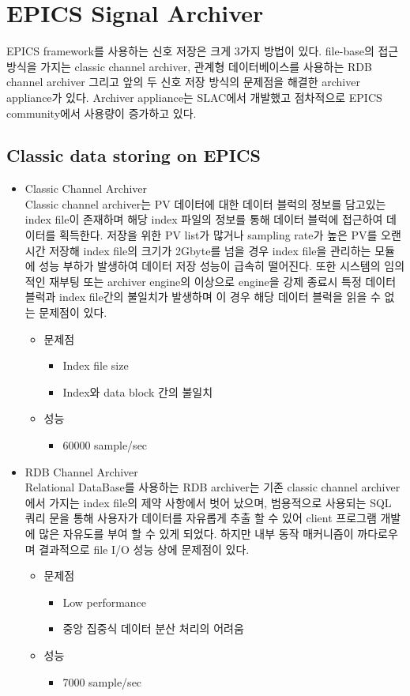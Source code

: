 \documentclass[11pt
  , a4paper
  , article
  , oneside
]{memoir}
\begin{document}
\section{EPICS Signal Archiver}
EPICS framework를 사용하는 신호 저장은 크게 3가지 방법이 있다. file-base의 접근 방식을 가지는 classic channel archiver, 관계형 데이터베이스를 사용하는 RDB channel archiver 그리고 앞의 두 신호 저장 방식의 문제점을 해결한 archiver appliance가 있다. Archiver appliance는 SLAC에서 개발했고 점차적으로 EPICS community에서 사용량이 증가하고 있다.
\subsection{Classic data storing on EPICS}
\begin{itemize}
	\item Classic Channel Archiver\\
	Classic channel archiver는 PV 데이터에 대한 데이터 블럭의 정보를 담고있는 index file이 존재하며 해당 index 파일의 정보를 통해 데이터 블럭에 접근하여 데이터를 획득한다. 저장을 위한 PV list가 많거나 sampling rate가 높은 PV를 오랜시간 저장해 index file의 크기가 2Gbyte를 넘을 경우 index file을 관리하는 모듈에 성능 부하가 발생하여 데이터 저장 성능이 급속히 떨어진다. 또한 시스템의 임의적인 재부팅 또는 archiver engine의 이상으로 engine을 강제 종료시 특정 데이터 블럭과 index file간의 불일치가 발생하며 이 경우 해당 데이터 블럭을 읽을 수 없는 문제점이 있다.
	\begin{itemize}
		\item 문제점
		\begin{itemize}
			\item Index file size
			\item Index와 data block 간의 불일치
		\end{itemize}
		\item 성능
		\begin{itemize}
			\item 60000 sample/sec
		\end{itemize}
	\end{itemize}
	\item RDB Channel Archiver\\
	Relational DataBase를 사용하는 RDB archiver는 기존 classic channel archiver에서 가지는 index file의 제약 사항에서 벗어 났으며, 범용적으로 사용되는 SQL 쿼리 문을 통해 사용자가 데이터를 자유롭게 추출 할 수 있어 client 프로그램 개발에 많은 자유도를 부여 할 수 있게 되었다. 하지만 내부 동작 매커니즘이 까다로우며 결과적으로 file I/O 성능 상에 문제점이 있다.
	\begin{itemize}
		\item 문제점
		\begin{itemize}
			\item Low performance
			\item 중앙 집중식 데이터 분산 처리의 어려움
		\end{itemize}
		\item 성능
		\begin{itemize}
			\item 7000 sample/sec
		\end{itemize}	
	\end{itemize}
\end{itemize}
\end{document}
